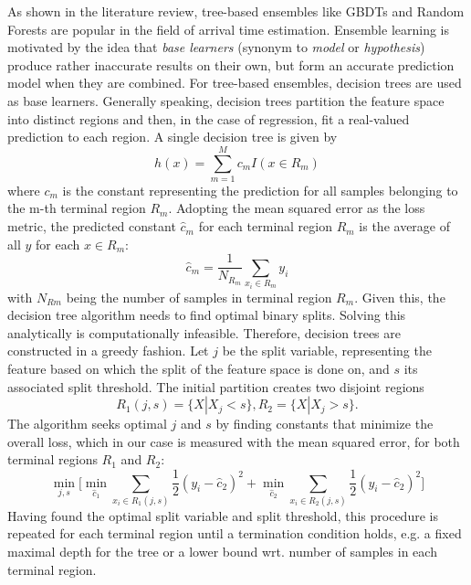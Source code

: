As shown in the literature review, tree-based ensembles like GBDTs and Random Forests are popular in the field of arrival time estimation. Ensemble learning is motivated by the idea that \textit{base learners} (synonym to \textit{model} or \textit{hypothesis}) produce rather inaccurate results on their own, but form an accurate prediction model when they are combined. For tree-based ensembles, decision trees are used as base learners. 
Generally speaking, decision trees partition the feature space into distinct regions and then, in the case of regression, fit a real-valued prediction to each region. 
A single decision tree is given by
\begin{equation}
h(x) = \sum_{m=1}^{M} c_m I(x \in R_m)
\end{equation}
where $ c_m $ is the constant representing the prediction for all samples belonging to the m-th terminal region $ R_m $. Adopting the mean squared error as the loss metric, the predicted constant $ \hat{c}_m $ for each terminal region $ R_m $ is the average of all $ y $ for each $ x \in R_m $:
\begin{equation}
	\hat{c}_m =  \dfrac{1}{N_{R_m}}\sum_{x_i \in R_m}^{} y_i
\end{equation}
with $ N_{Rm} $ being the number of samples in terminal region $ R_m $. Given this, the decision tree algorithm needs to find optimal binary splits. Solving this analytically is computationally infeasible. Therefore, decision trees are constructed in a greedy fashion.
Let $ j $ be the split variable, representing the feature based on which the split of the feature space is done on, and $ s $ its associated split threshold.
The initial partition creates two disjoint regions
\begin{equation}
	R_1 (j,s) = \{X | X_j < s \}, R_{2} = \{X | X_j > s\}.
\end{equation}
The algorithm seeks optimal $ j $ and $ s $ by finding constants that minimize the overall loss, which in our case is measured with the mean squared error, for both terminal regions $ R_1 $ and $ R_2 $:
\begin{equation}\label{minjs}
	\min_{j,s} \bigg [\min_{\hat{c}_1} \sum_{x_i \in R_1(j,s)} \dfrac{1}{2}(y_i - \hat{c}_{2})^2 + \min_{\hat{c}_2} \sum_{x_i \in R_{2}(j,s)} \dfrac{1}{2}(y_i - \hat{c}_{2})^2\bigg]
\end{equation}
Having found the optimal split variable and split threshold, this procedure is repeated for each terminal region until a termination condition holds, e.g. a fixed maximal depth for the tree or a lower bound wrt. number of samples in each terminal region. 
